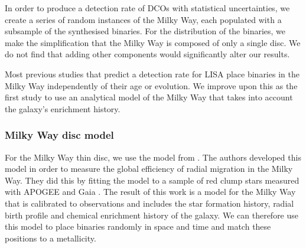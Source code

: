 \documentclass[twocolumn]{aastex63}
\begin{document}
In order to produce a detection rate of DCOs with statistical uncertainties, we create a series of random instances of the Milky Way, each populated with a subsample of the synthesised binaries. For the distribution of the binaries, we make the simplification that the Milky Way is composed of only a single disc. We do not find that adding other components would significantly alter our results.

Most previous studies that predict a detection rate for LISA place binaries in the Milky Way independently of their age or evolution. We improve upon this as the first study to use an analytical model of the Milky Way that takes into account the galaxy's enrichment history.

\subsubsection{Milky Way disc model}

For the Milky Way thin disc, we use the model from \citet{Frankel+2018}. The authors developed this model in order to measure the global efficiency of radial migration in the Milky Way. They did this by fitting the model to a sample of red clump stars measured with APOGEE \citep{APOGEE} and Gaia \citep{Gaia-Collaboration+2016}. The result of this work is a model for the Milky Way that is calibrated to observations and includes the star formation history, radial birth profile and chemical enrichment history of the galaxy. We can therefore use this model to place binaries randomly in space and time and match these positions to a metallicity.
\end{document}
